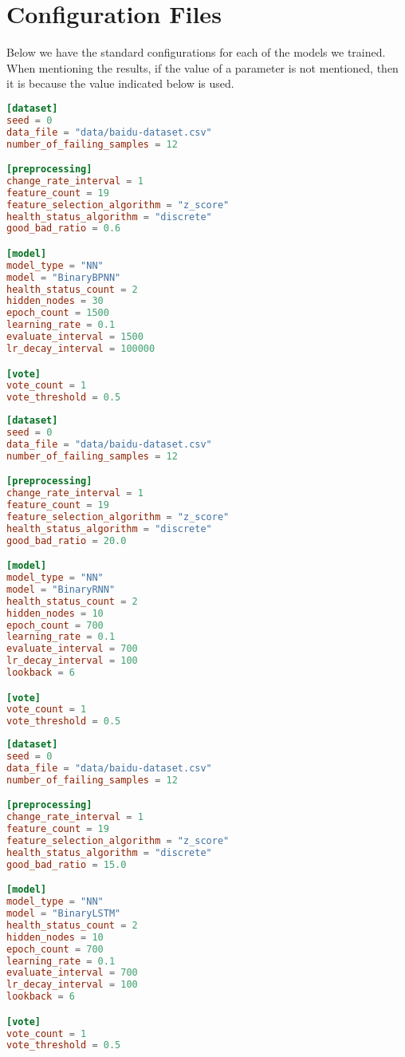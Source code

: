 \chapter{Configuration Files}\label{chap:config_files}

Below we have the standard configurations for each of the models we trained.
When mentioning the results, if the value of a parameter is not mentioned, then it is because the value indicated below is used.

\begin{lstlisting}[language=Toml,caption={Default configuration file for a Binary BPNN}]
[dataset]
seed = 0
data_file = "data/baidu-dataset.csv"
number_of_failing_samples = 12

[preprocessing]
change_rate_interval = 1
feature_count = 19
feature_selection_algorithm = "z_score"
health_status_algorithm = "discrete"
good_bad_ratio = 0.6

[model]
model_type = "NN"
model = "BinaryBPNN"
health_status_count = 2
hidden_nodes = 30
epoch_count = 1500
learning_rate = 0.1
evaluate_interval = 1500
lr_decay_interval = 100000

[vote]
vote_count = 1
vote_threshold = 0.5
\end{lstlisting}

\newpage

\begin{lstlisting}[language=Toml,caption={Default configuration file for a Binary RNN}]
[dataset]
seed = 0
data_file = "data/baidu-dataset.csv"
number_of_failing_samples = 12

[preprocessing]
change_rate_interval = 1
feature_count = 19
feature_selection_algorithm = "z_score"
health_status_algorithm = "discrete"
good_bad_ratio = 20.0

[model]
model_type = "NN"
model = "BinaryRNN"
health_status_count = 2
hidden_nodes = 10
epoch_count = 700
learning_rate = 0.1
evaluate_interval = 700
lr_decay_interval = 100
lookback = 6

[vote]
vote_count = 1
vote_threshold = 0.5
\end{lstlisting}

\begin{lstlisting}[language=Toml,caption={Default configuration file for a Binary LSTM}]
[dataset]
seed = 0
data_file = "data/baidu-dataset.csv"
number_of_failing_samples = 12

[preprocessing]
change_rate_interval = 1
feature_count = 19
feature_selection_algorithm = "z_score"
health_status_algorithm = "discrete"
good_bad_ratio = 15.0

[model]
model_type = "NN"
model = "BinaryLSTM"
health_status_count = 2
hidden_nodes = 10
epoch_count = 700
learning_rate = 0.1
evaluate_interval = 700
lr_decay_interval = 100
lookback = 6

[vote]
vote_count = 1
vote_threshold = 0.5
\end{lstlisting}

